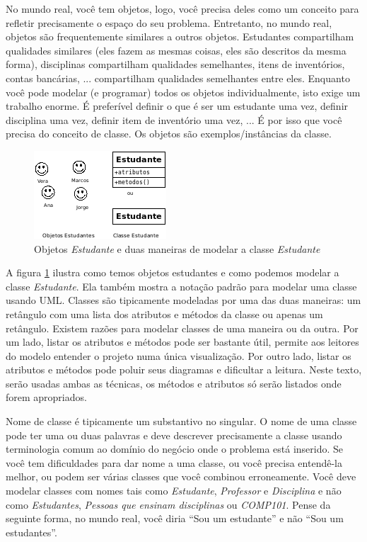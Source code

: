 No mundo real, você tem objetos, logo, você precisa deles como um conceito para refletir precisamente o espaço do seu problema. Entretanto, no mundo real, objetos são frequentemente similares a outros objetos. Estudantes compartilham qualidades similares (eles fazem as mesmas coisas, eles são descritos da mesma forma), disciplinas compartilham qualidades semelhantes, itens de  inventórios, contas bancárias, ... compartilham qualidades semelhantes entre eles. Enquanto você pode modelar (e programar) todos os objetos individualmente, isto exige um trabalho enorme. É preferível definir o que é ser um estudante uma vez, definir disciplina uma vez, definir item de inventório uma vez, ... É por isso que você precisa do conceito de classe. Os objetos são exemplos/instâncias da classe.

\begin{figure}[h]
\begin{center}
\includegraphics[scale=1]{objClassStdt.png} 
\caption[Objetos e Classe \emph{Estudante}]{Objetos \emph{Estudante} e duas maneiras de modelar a classe \emph{Estudante}} \label{fig:objStdt}
\end{center}
\end{figure}

A figura \ref{fig:objStdt} ilustra como temos objetos estudantes e como podemos modelar a classe \emph{Estudante}. Ela também mostra a notação padrão para modelar uma classe usando UML. Classes são tipicamente modeladas por uma das duas maneiras: um retângulo com uma lista dos atributos e métodos da classe ou apenas um retângulo. Existem razões para modelar classes de uma maneira ou da outra. Por um lado, listar os atributos e métodos pode ser bastante útil, permite aos leitores do modelo entender o projeto numa única visualização. Por outro lado, listar os atributos e métodos pode poluir seus diagramas e dificultar a leitura. Neste texto, serão usadas ambas as técnicas, os métodos e atributos só serão listados onde forem apropriados.

Nome de classe é tipicamente um substantivo no singular. O nome de uma classe pode ter uma ou duas palavras e deve descrever precisamente a classe usando terminologia comum ao domínio do negócio onde o problema está inserido. Se você tem dificuldades para dar nome a uma classe, ou você precisa entendê-la melhor, ou podem ser várias classes que você combinou erroneamente. Você deve modelar classes com nomes tais como \emph{Estudante}, \emph{Professor} e \emph{Disciplina} e não como \textit{Estudantes}, \textit{Pessoas que ensinam disciplinas} ou \textit{COMP101}. Pense da seguinte forma, no mundo real, você diria ``Sou um estudante'' e não ``Sou um estudantes''.

